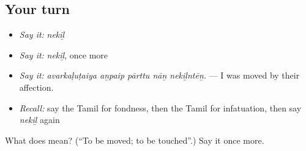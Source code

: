 \subsection*{Your turn}
\begin{itemize}
\raggedright
  \item \emph{Say it:} \emph{nekiḻ}
  \item \emph{Say it:} \emph{nekiḻ}, once more
  \item \emph{Say it:} \emph{avarkaḷuṭaiya aṉpaip pārttu nāṉ nekiḻntēṉ.} — I was moved by their affection.
  \item \emph{Recall:} say the Tamil for fondness, then the Tamil for infatuation, then say \emph{nekiḻ} again
\end{itemize}

\begin{tcolorbox}[breakable,colback=teal!4,colframe=teal!35!black,title={Before you move on}]
What does  mean? (\textquotedblleft{}To be moved; to be touched\textquotedblright{}.) Say it once more.
\end{tcolorbox}
